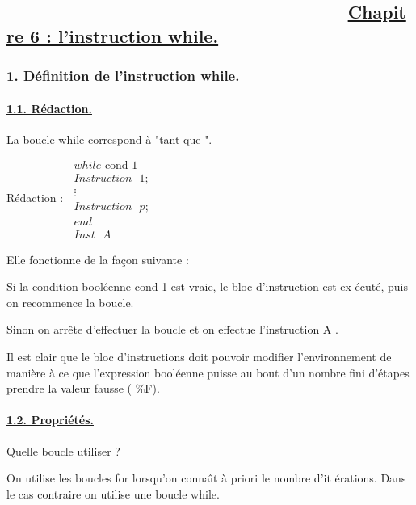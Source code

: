 \documentclass{article}
\begin{document}
\subsection{ \ \ \ \ \ \ \ \ \ \ \ \ \ \ \ \ \ \ \ \ \ \ \ \ \ \ \ \ \ \ \ \
\ \ \ \protect\underline{Chapitre 6 : l'instruction while.}}

\bigskip

\subsubsection{\protect\underline{1. D\'{e}finition de l'instruction while.}}

\paragraph{\protect\underline{1.1. R\'{e}daction.}}

La boucle while correspond \`{a} "tant que ".

R\'{e}daction : $\ 
\begin{array}{c}
while\text{ cond 1 } \\ 
Instruction\text{ }1; \\ 
\vdots \\ 
Instruction\text{ }p; \\ 
end \\ 
Inst\text{ }A%
\end{array}%
$

Elle fonctionne de la fa\c{c}on suivante :

Si la condition bool\'{e}enne cond 1 est vraie, le bloc d'instruction est ex%
\'{e}cut\'{e}, puis on recommence la boucle.

Sinon on arr\^{e}te d'effectuer la boucle et on effectue l'instruction A .

Il est clair que le bloc d'instructions doit pouvoir modifier
l'environnement de mani\`{e}re \`{a} ce que l'expression bool\'{e}enne
puisse au bout d'un nombre fini d'\'{e}tapes prendre la valeur fausse ( \%F).

\paragraph{\protect\underline{1.2. Propri\'{e}t\'{e}s.}}

\underline{Quelle boucle utiliser ?}

On utilise les boucles for lorsqu'on conna\^{\i}t \`{a} priori le nombre d'it%
\'{e}rations. Dans le cas contraire on utilise une boucle while.
\end{document}
